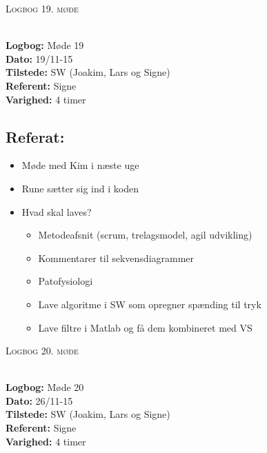 \documentclass[a4paper,11pt,oneside]{memoir}
\begin{document}
\newpage



\begin{center} 
\huge{\textsc{Logbog 19. møde}}
\end{center}

\textbf{ }
\\
\textbf{Logbog:} Møde 19
\\
\textbf{Dato:} 19/11-15
\\
\textbf{Tilstede:} SW (Joakim, Lars og Signe)
\\
\textbf{Referent:} Signe
\\
\textbf{Varighed:} 4 timer
\\

\subsection{Referat:}
\begin{itemize}
\item Møde med Kim i næste uge 
\item Rune sætter sig ind i koden
\item Hvad skal laves?
\begin{itemize}
\item Metodeafsnit (scrum, trelagsmodel, agil udvikling) 
\item Kommentarer til sekvensdiagrammer
\item Patofysiologi 
\item Lave algoritme i SW som opregner spænding til tryk
\item Lave filtre i Matlab og få dem kombineret med VS
\end{itemize}
\end{itemize}


\newpage



\begin{center} 
\huge{\textsc{Logbog 20. møde}}
\end{center}

\textbf{ }
\\
\textbf{Logbog:} Møde 20
\\
\textbf{Dato:} 26/11-15
\\
\textbf{Tilstede:} SW (Joakim, Lars og Signe)
\\
\textbf{Referent:} Signe
\\
\textbf{Varighed:} 4 timer
\\
\end{document}
